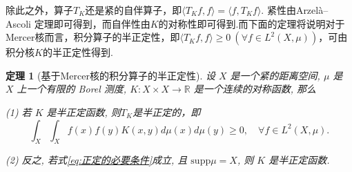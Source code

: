 \documentclass[12pt, a4paper, oneside]{ctexbook}
\newtheorem{theorem}{定理}[section]
\begin{document}
除此之外，算子$T_K$还是紧的自伴算子，即$\langle T_Kf,f\rangle=\langle f,T_Kf\rangle$. 紧性由Arzelà–Ascoli 定理即可得到，而自伴性由$K$的对称性即可得到.而下面的定理将说明对于Mercer核而言，积分算子的半正定性，即$\langle T_Kf,f\rangle\geq 0~(\forall f\in L^2(X,\mu))$，可由积分核$K$的半正定性得到.
\begin{theorem}[基于Mercer核的积分算子的半正定性]\label{thm:基于Mercer核的积分算子的半正定性}
    设 $X$ 是一个紧的距离空间, $\mu$ 是 $X$ 上一个有限的 Borel 测度, $K: X \times X \to \mathbb{R}$ 是一个连续的对称函数, 那么

(1) 若 $K$ 是半正定函数, 则$T_K$是半正定的，即
\begin{equation}\label{eq:正定的必要条件}
    \int_X \int_X f(x)f(y)K(x,y)d\mu(x)d\mu(y) \geq 0, \quad \forall f \in L^2(X,\mu).
\end{equation}

(2) 反之, 若式\eqref{eq:正定的必要条件}成立, 且 $\text{supp}\mu = X$, 则 $K$ 是半正定函数.
\end{theorem}
\end{document}
